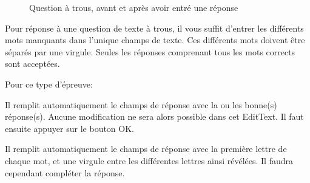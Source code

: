 \documentclass[11pt]{scrreprt}
\begin{document}
\begin{figure}[H]
{        }
        \caption{Question à trous, avant et après avoir entré une réponse}
    \end{figure}
    Pour réponse à une question de texte à trous, il vous suffit d'entrer les différents mots manquants dans l'unique champs de texte. Ces différents mots doivent être séparés par une virgule. Seules les réponses comprenant tous les mots corrects sont acceptées.

    Pour ce type d'épreuve:
    \begin{description}[style=nextline]
        \item[Bouton de triche]Il remplit automatiquement le champs de réponse avec la ou les bonne(s) réponse(s). Aucune modification ne sera alors possible dans cet EditText. Il faut ensuite appuyer sur le bouton OK.
        \item[Bouton d'aide]Il remplit automatiquement le champs de réponse avec la première lettre de chaque mot, et une virgule entre les différentes lettres ainsi révélées. Il faudra cependant compléter la réponse.
    \end{description}
\end{document}
